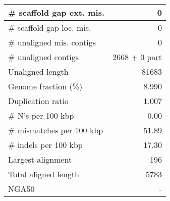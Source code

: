\documentclass[12pt,a4paper]{article}
\begin{document}
\begin{table}[ht]
\begin{center}
\begin{tabular}{|l*{1}{|r}|}
\# scaffold gap ext. mis. & 0 \\ \hline
\# scaffold gap loc. mis. & 0 \\ \hline
\# unaligned mis. contigs & 0 \\ \hline
\# unaligned contigs & 2668 + 0 part \\ \hline
Unaligned length & 81683 \\ \hline
Genome fraction (\%) & 8.990 \\ \hline
Duplication ratio & 1.007 \\ \hline
\# N's per 100 kbp & 0.00 \\ \hline
\# mismatches per 100 kbp & 51.89 \\ \hline
\# indels per 100 kbp & 17.30 \\ \hline
Largest alignment & 196 \\ \hline
Total aligned length & 5783 \\ \hline
NGA50 & - \\ \hline
\end{tabular}
\end{center}
\end{table}
\end{document}
